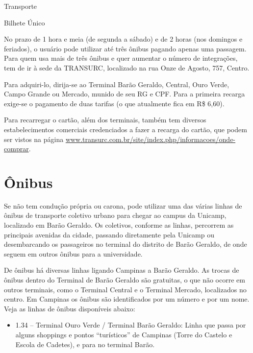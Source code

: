 
\begin{story}{Transporte}

\begin{sidebar}{Bilhete Único}

No prazo de 1 hora e meia (de segunda a sábado) e de 2 horas (nos domingos e feriados), o usuário pode utilizar até três ônibus pagando apenas uma passagem. Para quem usa mais de três ônibus e quer aumentar o número de integrações, tem de ir à sede da TRANSURC, localizado na rua Onze de Agosto, 757, Centro.

Para adquiri-lo, dirija-se ao Terminal Barão Geraldo, Central, Ouro Verde, Campo Grande ou Mercado, munido de seu RG e CPF. Para a primeira recarga exige-se o pagamento de duas tarifas (o que atualmente fica em R\$ 6,60).

Para recarregar o cartão, além dos terminais, também tem diversos estabelecimentos comerciais credenciados a fazer a recarga do cartão, que podem ser vistos na página \url{www.transurc.com.br/site/index.php/informacoes/onde-comprar}.

\end{sidebar}

\section*{Ônibus}

Se não tem condução própria ou carona, pode utilizar uma das várias linhas de ônibus de transporte coletivo urbano para chegar ao campus da Unicamp, localizado em Barão Geraldo. Os coletivos, conforme as linhas, percorrem as principais avenidas da cidade, passando diretamente pela Unicamp ou desembarcando os passageiros no terminal do distrito de Barão Geraldo, de onde seguem em outros ônibus para a universidade.

De ônibus há diversas linhas ligando Campinas a Barão Geraldo. As trocas de ônibus dentro do Terminal de Barão Geraldo são gratuitas, o que não ocorre em outros terminais, como o Terminal Central e o Terminal Mercado, localizados no centro. Em Campinas os ônibus são identificados por um número e por um nome. Veja as linhas de ônibus disponíveis abaixo:

\begin{itemize}
\item 1.34 -- Terminal Ouro Verde / Terminal Barão Geraldo: Linha que passa por alguns shoppings e pontos ``turísticos'' de Campinas (Torre do Castelo e Escola de Cadetes), e para no terminal Barão.


\end{itemize}
\end{story}
